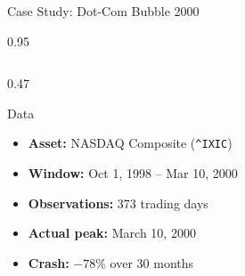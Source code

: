 \documentclass[9pt, aspectratio=169, t]{beamer}
\begin{document}
\begin{frame}{Case Study: Dot-Com Bubble 2000}
    \begin{cminipage}{0.95\textwidth}
    {\footnotesize
    \begin{columns}[T]
        \begin{column}{0.47\textwidth}
            \begin{block}{Data}
                \begin{itemize}\setlength{\itemsep}{0pt}
                    \item \textbf{Asset:} NASDAQ Composite (\texttt{\^{}IXIC})
                    \item \textbf{Window:} Oct 1, 1998 -- Mar 10, 2000
                    \item \textbf{Observations:} 373 trading days
                    \item \textbf{Actual peak:} March 10, 2000
                    \item \textbf{Crash:} $-78\%$ over 30 months
                \end{itemize}
            \end{block}


\end{column}
\end{columns}}
\end{cminipage}
\end{frame}
\end{document}

